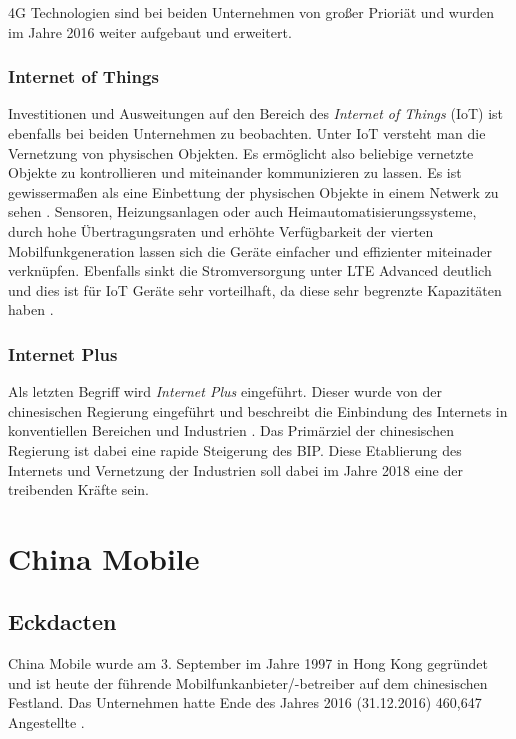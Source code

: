 4G Technologien sind bei beiden Unternehmen von großer Prioriät und wurden im Jahre 2016 weiter aufgebaut und erweitert.

\subsubsection{Internet of Things}

Investitionen und Ausweitungen auf den Bereich des \textit{Internet of Things} (IoT) ist ebenfalls bei beiden Unternehmen zu beobachten. Unter IoT versteht man die Vernetzung von physischen Objekten. Es ermöglicht also beliebige vernetzte Objekte zu kontrollieren und miteinander kommunizieren zu lassen. Es ist gewissermaßen als eine Einbettung der physischen Objekte in einem Netwerk zu sehen \cite{iotcisco}. Sensoren, Heizungsanlagen oder auch Heimautomatisierungssysteme, durch hohe Übertragungsraten und erhöhte Verfügbarkeit der vierten Mobilfunkgeneration lassen sich die Geräte einfacher und effizienter miteinader verknüpfen. Ebenfalls sinkt die Stromversorgung unter LTE Advanced deutlich und dies ist für IoT Geräte sehr vorteilhaft, da diese sehr begrenzte Kapazitäten haben \cite{iotnokia}.  

\subsubsection{Internet Plus}

Als letzten Begriff wird \textit{Internet Plus} eingeführt. Dieser wurde von der chinesischen Regierung eingeführt und beschreibt die Einbindung des Internets in konventiellen Bereichen und Industrien \cite{internetplus}. Das Primärziel der chinesischen Regierung ist dabei eine rapide Steigerung des BIP. Diese Etablierung des Internets und Vernetzung der Industrien soll dabei im Jahre 2018 eine der treibenden Kräfte sein.  

\section{China Mobile}
\label{sec:china}
\subsection{Eckdacten}

China Mobile wurde am 3. September im Jahre 1997 in Hong Kong gegründet und ist heute der führende Mobilfunkanbieter/-betreiber auf dem chinesischen Festland. Das Unternehmen hatte Ende des Jahres 2016 (31.12.2016) 460,647 Angestellte \cite{chinasite}.

